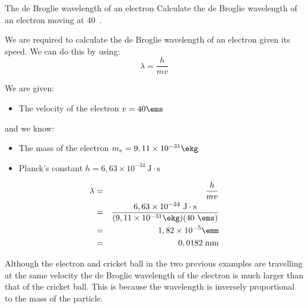 \begin{wex}{The de Broglie wavelength of an electron}
{Calculate the de Broglie wavelength of an electron moving at 40~\ms.}
{
We are required to calculate the de Broglie wavelength of an electron given its speed. We can do this by using:
$$\lambda=\frac{h}{mv}$$

We are given:
\begin{itemize}
\item The velocity of the electron {$v=40\ems$}
\end{itemize}
and we know:
\begin{itemize}
\item The mass of the electron {$m_{e}=9,11 \times 10^{-31}\ekg$}
\item Planck's constant {$h=6,63 \times 10^{-34}~\mathrm{J\cdot s}$}
\end{itemize}

\begin{eqnarray*}
\lambda&=&\frac{h}{mv}\\
&=&\frac{6,63\times10^{-34}~\mathrm{J\cdot s}}{(9,11 \times 10^{-31}\ekg)(40~\ems)}\\
& = & 1,82 \times 10^{-5}\emm\\
&=&0,0182\;\mathrm{mm}
\end{eqnarray*}
}
\end{wex}


Although the electron and cricket ball in the two previous examples are travelling at the same velocity the de Broglie wavelength of the electron is much larger than that of the cricket ball. This is because the wavelength is inversely proportional to the mass of the particle.

